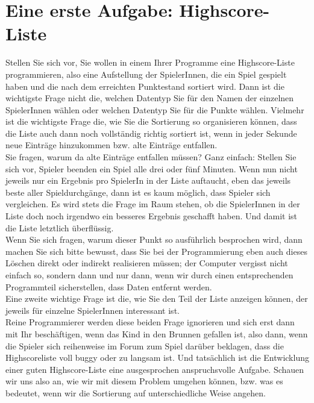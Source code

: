 \chapter{Eine erste Aufgabe: Highscore-Liste}

Stellen Sie sich vor, Sie wollen in einem Ihrer Programme eine Highscore-Liste programmieren, also eine Aufstellung der SpielerInnen, die ein Spiel gespielt haben und die nach dem erreichten Punktestand sortiert wird. Dann ist die wichtigste Frage nicht die, welchen Datentyp Sie für den Namen der einzelnen SpielerInnen wählen oder welchen Datentyp Sie für die Punkte wählen. Vielmehr ist die wichtigste Frage die, wie Sie die Sortierung so organisieren können, dass die Liste auch dann noch vollständig richtig sortiert ist, wenn in jeder Sekunde neue Einträge hinzukommen bzw. alte Einträge entfallen.\\

Sie fragen, warum da alte Einträge entfallen müssen? Ganz einfach: Stellen Sie sich vor, Spieler beenden ein Spiel alle drei oder fünf Minuten. Wenn nun nicht jeweils nur ein Ergebnis pro SpielerIn in der Liste auftaucht, eben das jeweils beste aller Spieldurchgänge, dann ist es kaum möglich, dass Spieler sich vergleichen. Es wird stets die Frage im Raum stehen, ob die SpielerInnen in der Liste doch noch irgendwo ein besseres Ergebnis geschafft haben. Und damit ist die Liste letztlich überflüssig.\\

Wenn Sie sich fragen, warum dieser Punkt so ausführlich besprochen wird, dann machen Sie sich bitte bewusst, dass Sie bei der Programmierung eben auch dieses Löschen direkt oder indirekt realisieren müssen; der Computer vergisst nicht einfach so, sondern dann und nur dann, wenn wir durch einen entsprechenden Programmteil sicherstellen, dass Daten entfernt werden.\\

Eine zweite wichtige Frage ist die, wie Sie den Teil der Liste anzeigen können, der jeweils für einzelne SpielerInnen interessant ist.\\

Reine Programmierer werden diese beiden Frage ignorieren und sich erst dann mit Ihr beschäftigen, wenn das Kind in den Brunnen gefallen ist, also dann, wenn die Spieler sich reihenweise im Forum zum Spiel darüber beklagen, dass die Highscoreliste \glqq{}voll buggy\grqq{} oder \glqq{}zu langsam\grqq{} ist. Und tatsächlich ist die Entwicklung einer \glqq{}guten\grqq{} Highscore-Liste eine ausgesprochen anspruchsvolle Aufgabe. Schauen wir uns also an, wie wir mit diesem Problem umgehen können, bzw. was es bedeutet, wenn wir die Sortierung auf unterschiedliche Weise angehen.\\

